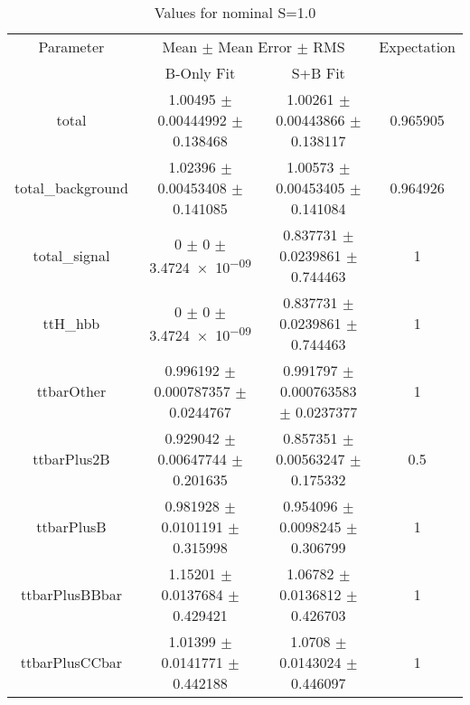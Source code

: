 \begin{table}
\centering
\caption{Values for nominal S=1.0}
\begin{tabular}{cccc}
\toprule
Parameter & \multicolumn{2}{c}{Mean $\pm$ Mean Error $\pm$ RMS} & Expectation\\
 & B-Only Fit & S+B Fit & \\
\midrule
total & \num{1.00495} $\pm$ \num{0.00444992} $\pm$ \num{0.138468} & \num{1.00261} $\pm$ \num{0.00443866} $\pm$ \num{0.138117} & \num{0.965905}\\
total\_background & \num{1.02396} $\pm$ \num{0.00453408} $\pm$ \num{0.141085} & \num{1.00573} $\pm$ \num{0.00453405} $\pm$ \num{0.141084} & \num{0.964926}\\
total\_signal & \num{0} $\pm$ \num{0} $\pm$ \num{3.4724e-09} & \num{0.837731} $\pm$ \num{0.0239861} $\pm$ \num{0.744463} & \num{1}\\
ttH\_hbb & \num{0} $\pm$ \num{0} $\pm$ \num{3.4724e-09} & \num{0.837731} $\pm$ \num{0.0239861} $\pm$ \num{0.744463} & \num{1}\\
ttbarOther & \num{0.996192} $\pm$ \num{0.000787357} $\pm$ \num{0.0244767} & \num{0.991797} $\pm$ \num{0.000763583} $\pm$ \num{0.0237377} & \num{1}\\
ttbarPlus2B & \num{0.929042} $\pm$ \num{0.00647744} $\pm$ \num{0.201635} & \num{0.857351} $\pm$ \num{0.00563247} $\pm$ \num{0.175332} & \num{0.5}\\
ttbarPlusB & \num{0.981928} $\pm$ \num{0.0101191} $\pm$ \num{0.315998} & \num{0.954096} $\pm$ \num{0.0098245} $\pm$ \num{0.306799} & \num{1}\\
ttbarPlusBBbar & \num{1.15201} $\pm$ \num{0.0137684} $\pm$ \num{0.429421} & \num{1.06782} $\pm$ \num{0.0136812} $\pm$ \num{0.426703} & \num{1}\\
ttbarPlusCCbar & \num{1.01399} $\pm$ \num{0.0141771} $\pm$ \num{0.442188} & \num{1.0708} $\pm$ \num{0.0143024} $\pm$ \num{0.446097} & \num{1}\\
\bottomrule
\end{tabular}
\end{table}